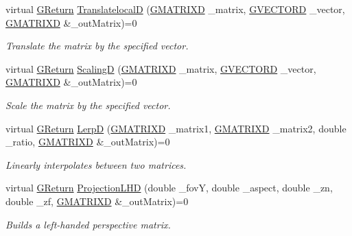\begin{DoxyCompactItemize}
virtual \hyperlink{namespaceGW_a67a839e3df7ea8a5c5686613a7a3de21}{G\+Return} \hyperlink{classGW_1_1MATH_1_1GMatrix_a03adfd30119a70006679ee98a320591a}{TranslatelocalD} (\hyperlink{structGW_1_1MATH_1_1GMATRIXD}{G\+M\+A\+T\+R\+I\+XD} \+\_\+matrix, \hyperlink{structGW_1_1MATH_1_1GVECTORD}{G\+V\+E\+C\+T\+O\+RD} \+\_\+vector, \hyperlink{structGW_1_1MATH_1_1GMATRIXD}{G\+M\+A\+T\+R\+I\+XD} \&\+\_\+out\+Matrix)=0
\begin{DoxyCompactList}\small\item\em Translate the matrix by the specified vector. \end{DoxyCompactList}\item 
virtual \hyperlink{namespaceGW_a67a839e3df7ea8a5c5686613a7a3de21}{G\+Return} \hyperlink{classGW_1_1MATH_1_1GMatrix_adcfdcd010361f3de14661e7d8a54a1dc}{ScalingD} (\hyperlink{structGW_1_1MATH_1_1GMATRIXD}{G\+M\+A\+T\+R\+I\+XD} \+\_\+matrix, \hyperlink{structGW_1_1MATH_1_1GVECTORD}{G\+V\+E\+C\+T\+O\+RD} \+\_\+vector, \hyperlink{structGW_1_1MATH_1_1GMATRIXD}{G\+M\+A\+T\+R\+I\+XD} \&\+\_\+out\+Matrix)=0
\begin{DoxyCompactList}\small\item\em Scale the matrix by the specified vector. \end{DoxyCompactList}\item 
virtual \hyperlink{namespaceGW_a67a839e3df7ea8a5c5686613a7a3de21}{G\+Return} \hyperlink{classGW_1_1MATH_1_1GMatrix_ad53d4038a37cafb207bda974d80009d5}{LerpD} (\hyperlink{structGW_1_1MATH_1_1GMATRIXD}{G\+M\+A\+T\+R\+I\+XD} \+\_\+matrix1, \hyperlink{structGW_1_1MATH_1_1GMATRIXD}{G\+M\+A\+T\+R\+I\+XD} \+\_\+matrix2, double \+\_\+ratio, \hyperlink{structGW_1_1MATH_1_1GMATRIXD}{G\+M\+A\+T\+R\+I\+XD} \&\+\_\+out\+Matrix)=0
\begin{DoxyCompactList}\small\item\em Linearly interpolates between two matrices. \end{DoxyCompactList}\item 
virtual \hyperlink{namespaceGW_a67a839e3df7ea8a5c5686613a7a3de21}{G\+Return} \hyperlink{classGW_1_1MATH_1_1GMatrix_ab22d0d332f4b1d2f1a1f52b2efeebabe}{Projection\+L\+HD} (double \+\_\+fovY, double \+\_\+aspect, double \+\_\+zn, double \+\_\+zf, \hyperlink{structGW_1_1MATH_1_1GMATRIXD}{G\+M\+A\+T\+R\+I\+XD} \&\+\_\+out\+Matrix)=0
\begin{DoxyCompactList}\small\item\em Builds a left-\/handed perspective matrix. \end{DoxyCompactList}\item 

\end{DoxyCompactItemize}
